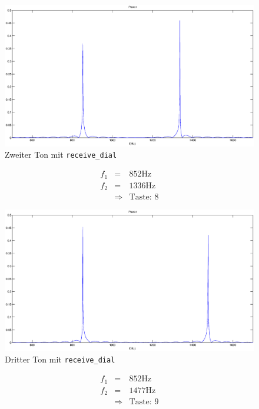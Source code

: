 \documentclass[10pt]{scrreprt}
\begin{document}
        \begin{center}
            \begin{figure}[H]
                \includegraphics[width=\textwidth]{img43542}
                \caption{Zweiter Ton mit \texttt{receive\_dial}}
            \end{figure}
        \end{center}
        \begin{eqnarray*}
            f_1 &=& 852 \si{\hertz}\\
            f_2 &=& 1336 \si{\hertz}\\
            &\Rightarrow& \text{Taste: }8
        \end{eqnarray*}

        \begin{center}
            \begin{figure}[H]
                \includegraphics[width=\textwidth]{img43543}
                \caption{Dritter Ton mit \texttt{receive\_dial}}
            \end{figure}
        \end{center}
        \begin{eqnarray*}
            f_1 &=& 852 \si{\hertz}\\
            f_2 &=& 1477 \si{\hertz}\\
            &\Rightarrow& \text{Taste: }9
        \end{eqnarray*}
\end{document}
